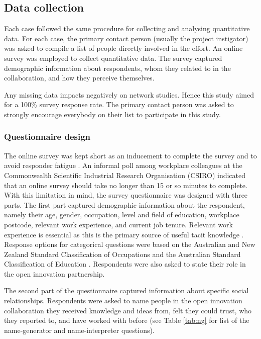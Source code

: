 \subsection{Data collection}

Each case followed the same procedure for collecting and analysing quantitative data. For each case, the primary contact person (usually the project instigator) was asked to compile a list of people directly involved in the effort. An online survey was employed to collect quantitative data. The survey captured demographic information about respondents, whom they related to in the collaboration, and how they perceive themselves.\medskip

Any missing data impacts negatively on network studies. Hence this study aimed for a 100\% survey response rate. The primary contact person was asked to strongly encourage everybody on their list to participate in this study. 

\subsubsection{Questionnaire design}

The online survey was kept short as an inducement to complete the survey and to avoid responder fatigue \citep{crawford2001web,evans2005value,van2006conducting}. An informal poll among workplace colleagues at the Commonwealth Scientific Industrial Research Organisation (CSIRO) indicated that an online survey should take no longer than 15 or so minutes to complete. With this limitation in mind, the survey questionnaire was designed with three parts. The first part captured demographic information about the respondent, namely their age, gender, occupation, level and field of education, workplace postcode, relevant work experience, and current job tenure. Relevant work experience is essential as this is the primary source of useful tacit knowledge \citep{nonaka1995knowledge,sternberg1999tacit}. Response options for categorical questions were based on the Australian and New Zealand Standard Classification of Occupations \citep{pink2009anzsco} and the Australian Standard Classification of Education \citep{trewin2000australian}. Respondents were also asked to state their role in the open innovation partnership. \medskip

The second part of the questionnaire captured information about specific social relationships. Respondents were asked to name people in the open innovation collaboration they received knowledge and ideas from, felt they could trust, who they reported to, and have worked with before (see Table \ref{tab:ng} for list of the name-generator and name-interpreter questions). \bigskip

